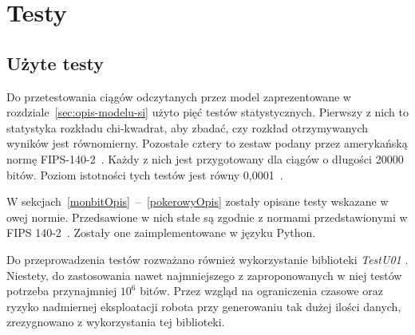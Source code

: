 \chapter{Testy}\label{ch:testy}

\section{Użyte testy}\label{testyOpis}

Do przetestowania ciągów odczytanych przez model zaprezentowane w rozdziale~\ref{sec:opis-modelu-si} użyto pięć
testów statystycznych. Pierwszy z nich to statystyka rozkładu chi-kwadrat, aby zbadać, czy rozkład otrzymywanych 
wyników jest równomierny. Pozostałe cztery to zestaw podany przez amerykańską normę FIPS-140-2~\cite{NIST2001}. Każdy z nich
jest przygotowany dla ciągów o długości 20000 bitów. Poziom istotności tych testów jest równy 0{,}0001~\cite{Kotulski2001}.


W sekcjach~\ref{monbitOpis}~--~\ref{pokerowyOpis} zostały opisane testy wskazane w owej normie. Przedsawione w nich stałe
są zgodnie z normami przedstawionymi w FIPS 140-2~\cite{NIST2001}. Zostały one zaimplementowane w języku Python.
\par
Do przeprowadzenia testów rozważano również wykorzystanie biblioteki \textit{TestU01} \cite{TestU01}. Niestety, do zastosowania nawet 
najmniejszego z zaproponowanych w niej testów potrzeba przynajmniej \begin{math} 10^6 \end{math} bitów. Przez 
wzgląd na ograniczenia czasowe oraz ryzyko nadmiernej eksploatacji robota przy generowaniu tak dużej ilości danych, 
zrezygnowano z wykorzystania tej biblioteki.


